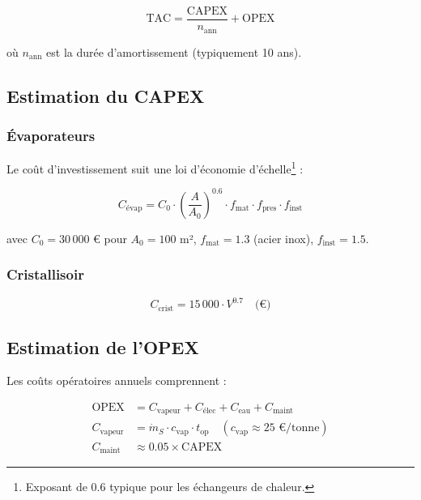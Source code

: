 \documentclass[12pt,a4paper,twoside]{article}
\begin{document}
\begin{equation}
\boxed{\text{TAC} = \frac{\text{CAPEX}}{n_{\text{ann}}} + \text{OPEX}}
\label{eq:tac}
\end{equation}

où $n_{\text{ann}}$ est la durée d'amortissement (typiquement 10 ans).

\subsection{Estimation du CAPEX}

\subsubsection{Évaporateurs}

Le coût d'investissement suit une loi d'économie d'échelle\footnote{Exposant de 0.6 typique pour les échangeurs de chaleur.} :

\begin{equation}
C_{\text{évap}} = C_0 \cdot \left(\frac{A}{A_0}\right)^{0.6} \cdot f_{\text{mat}} \cdot f_{\text{pres}} \cdot f_{\text{inst}}
\end{equation}

avec $C_0 = 30\,000$ €  pour $A_0 = 100$ m², $f_{\text{mat}} = 1.3$ (acier inox), $f_{\text{inst}} = 1.5$.

\subsubsection{Cristallisoir}

\begin{equation}
C_{\text{crist}} = 15\,000 \cdot V^{0.7} \quad \text{(€)}
\end{equation}

\subsection{Estimation de l'OPEX}

Les coûts opératoires annuels comprennent :

\begin{align}
\text{OPEX} &= C_{\text{vapeur}} + C_{\text{élec}} + C_{\text{eau}} + C_{\text{maint}} \\
C_{\text{vapeur}} &= \dot{m}_S \cdot c_{\text{vap}} \cdot t_{\text{op}} \quad (c_{\text{vap}} \approx 25 \text{ €/tonne}) \\
C_{\text{maint}} &\approx 0.05 \times \text{CAPEX}
\end{align}
\end{document}
